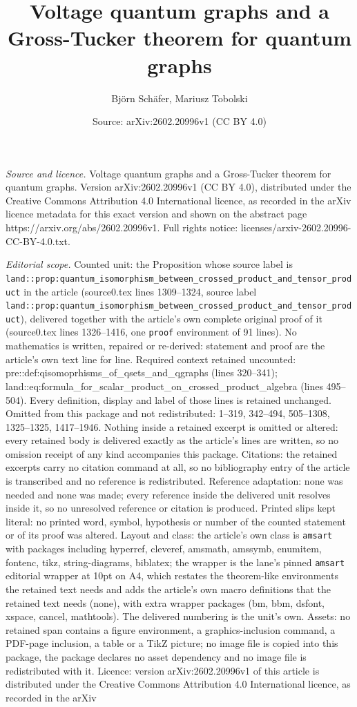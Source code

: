 \documentclass[10pt,a4paper]{amsart}
\title[Voltage quantum graphs and a Gross-Tucker theorem for quantu]{Voltage quantum graphs and a Gross-Tucker theorem for quantum graphs}
\author{Bj\"orn Sch\"afer, Mariusz Tobolski}
\date{Source: arXiv:2602.20996v1 (CC BY 4.0)}
\begin{document}
\maketitle

\noindent\emph{Source and licence.} Voltage quantum graphs and a Gross-Tucker theorem for quantum graphs. Version arXiv:2602.20996v1 (CC BY 4.0), distributed under the Creative Commons Attribution 4.0 International licence, as recorded in the arXiv licence metadata for this exact version and shown on the abstract page https://arxiv.org/abs/2602.20996v1. Full rights notice: licenses/arxiv-2602.20996-CC-BY-4.0.txt.\par\smallskip

\noindent\textit{Editorial scope.} Counted unit: the Proposition whose source label is \texttt{land::prop:quantum\_isomorphism\_between\_crossed\_product\_and\_tensor\_product} in the article (source0.tex lines 1309--1324, source label \texttt{land::prop:quantum\_isomorphism\_between\_crossed\_product\_and\_tensor\_product}), delivered together with the article's own complete original proof of it (source0.tex lines 1326--1416, one \texttt{proof} environment of 91 lines). No mathematics is written, repaired or re-derived: statement and proof are the article's own text line for line. Required context retained uncounted: pre::def:qisomoprhisms\_of\_qsets\_and\_qgraphs (lines 320--341); land::eq:formula\_for\_scalar\_product\_on\_crossed\_product\_algebra (lines 495--504). Every definition, display and label of those lines is retained unchanged. Omitted from this package and not redistributed: 1--319, 342--494, 505--1308, 1325--1325, 1417--1946. Nothing inside a retained excerpt is omitted or altered: every retained body is delivered exactly as the article's lines are written, so no omission receipt of any kind accompanies this package. Citations: the retained excerpts carry no citation command at all, so no bibliography entry of the article is transcribed and no reference is redistributed. Reference adaptation: none was needed and none was made; every reference inside the delivered unit resolves inside it, so no unresolved reference or citation is produced. Printed slips kept literal: no printed word, symbol, hypothesis or number of the counted statement or of its proof was altered. Layout and class: the article's own class is \texttt{amsart} with packages including hyperref, cleveref, amsmath, amssymb, enumitem, fontenc, tikz, string-diagrams, biblatex; the wrapper is the lane's pinned \texttt{amsart} editorial wrapper at 10pt on A4, which restates the theorem-like environments the retained text needs and adds the article's own macro definitions that the retained text needs (none), with extra wrapper packages (bm, bbm, dsfont, xspace, cancel, mathtools). The delivered numbering is the unit's own. Assets: no retained span contains a figure environment, a graphics-inclusion command, a PDF-page inclusion, a table or a TikZ picture; no image file is copied into this package, the package declares no asset dependency and no image file is redistributed with it. Licence: version arXiv:2602.20996v1 of this article is distributed under the Creative Commons Attribution 4.0 International licence, as recorded in the arXiv 
\end{document}
